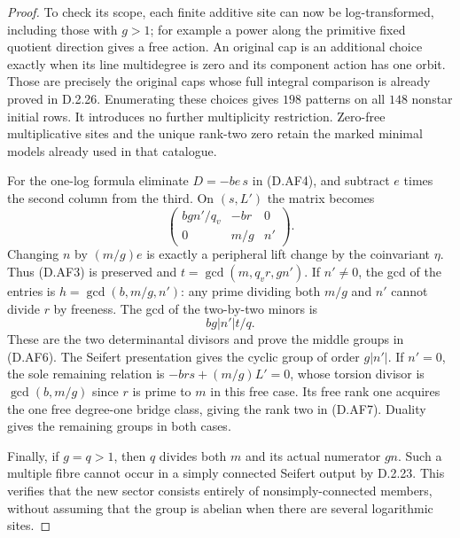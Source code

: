 \begin{proof}
To check its scope, each finite additive site can now be
log-transformed, including those with $g>1$; for example a
power along the primitive fixed quotient direction gives a
free action. An original cap is an additional choice exactly
when its line multidegree is zero and its component action
has one orbit. Those are precisely the original caps whose
full integral comparison is already proved in D.2.26.
Enumerating these choices gives $198$ patterns on all $148$
nonstar initial rows. It introduces no further multiplicity
restriction. Zero-free multiplicative sites and the unique
rank-two zero retain the marked minimal models already used
in that catalogue.

For the one-log formula eliminate $D=-be\,s$ in (D.AF4),
and subtract $e$ times the second column from the third.
On $(s,L')$ the matrix becomes
\[
 \begin{pmatrix}
  bgn'/q_v&-br&0\\
  0&m/g&n'
 \end{pmatrix}.                                            \tag{D.AF9}
\]
Changing $n$ by $(m/g)e$ is exactly a peripheral lift change
by the coinvariant $\eta$. Thus (D.AF3) is preserved and
$t=\gcd(m,q_vr,gn')$. If $n'\ne0$, the gcd of the entries is
$h=\gcd(b,m/g,n')$: any prime dividing both $m/g$ and $n'$
cannot divide $r$ by freeness. The gcd of the two-by-two
minors is
\[
 bg|n'|t/q.
\]
These are the two determinantal divisors and prove the
middle groups in (D.AF6). The Seifert presentation gives the
cyclic group of order $g|n'|$. If $n'=0$, the sole remaining
relation is $-brs+(m/g)L'=0$, whose torsion divisor is
$\gcd(b,m/g)$ since $r$ is prime to $m$ in this free case.
Its free rank one acquires the one free degree-one bridge
class, giving the rank two in (D.AF7). Duality gives the
remaining groups in both cases.

Finally, if $g=q>1$, then $q$ divides both $m$ and its actual
numerator $gn$. Such a multiple fibre cannot occur in a
simply connected Seifert output by D.2.23. This verifies
that the new sector consists entirely of nonsimply-connected
members, without assuming that the group is abelian when
there are several logarithmic sites.
\end{proof}
